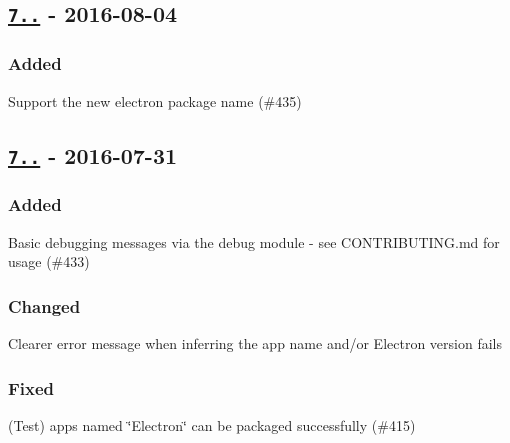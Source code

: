 \subsection*{\href{https://github.com/electron-userland/electron-packager/compare/v7.4.0...v7.5.0}{\tt 7..} -\/ 2016-\/08-\/04}

\subsubsection*{Added}


\begin{DoxyItemize}
\item Support the new {\ttfamily electron} package name (\#435)
\end{DoxyItemize}

\subsection*{\href{https://github.com/electron-userland/electron-packager/compare/v7.3.0...v7.4.0}{\tt 7..} -\/ 2016-\/07-\/31}

\subsubsection*{Added}


\begin{DoxyItemize}
\item Basic debugging messages via the {\ttfamily debug} module -\/ see C\+O\+N\+T\+R\+I\+B\+U\+T\+I\+N\+G.\+md for usage (\#433)
\end{DoxyItemize}

\subsubsection*{Changed}


\begin{DoxyItemize}
\item Clearer error message when inferring the app name and/or Electron version fails
\end{DoxyItemize}

\subsubsection*{Fixed}


\begin{DoxyItemize}
\item (Test) apps named \char`\"{}\+Electron\char`\"{} can be packaged successfully (\#415)
\end{DoxyItemize}

